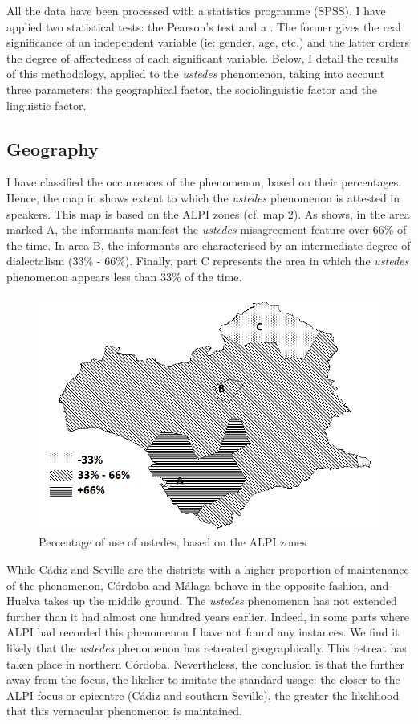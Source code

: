 \documentclass[output=paper]{LSP/langsci}
\begin{document}
All the data have been processed with a statistics programme (SPSS). I have applied two statistical tests: the Pearson’s  test and a . The former gives the real significance of an independent variable (ie: gender, age, etc.) and the latter orders the degree of affectedness of each significant variable. Below, I detail the results of this methodology, applied to the \textit{ustedes} phenomenon, taking into account three parameters: the geographical factor, the sociolinguistic factor and the linguistic factor.

\subsection{Geography}
I have classified the occurrences of the phenomenon, based on their percentages. Hence, the map in  shows extent to which the  \textit{ustedes} phenomenon is attested in speakers. This map is based on the ALPI zones (cf. map 2). As  shows, in the area marked A, the informants manifest the \textit{ustedes} misagreement feature over 66\% of the time. In area B, the informants are characterised by an intermediate degree of dialectalism (33\% - 66\%). Finally, part C represents the area in which the \textit{ustedes} phenomenon appears less than 33\% of the time.

\begin{figure}
\includegraphics[width=\textwidth]{illustrations/lara_fig3}
\caption{Percentage of use of ustedes, based on the ALPI zones}
\label{fig:3}
\end{figure}

While Cádiz and Seville are the districts with a higher proportion of maintenance of the phenomenon, Córdoba and Málaga behave in the opposite fashion, and Huelva takes up the middle ground. The \textit{ustedes} phenomenon has not extended further than it had almost one hundred years earlier. Indeed, in some parts where ALPI had recorded this phenomenon I have not found any instances. We find it likely that the \textit{ustedes} phenomenon has retreated geographically. This retreat has taken place in northern Córdoba. Nevertheless, the conclusion is that the further away from the focus, the likelier to imitate the standard usage: the closer to the ALPI focus or epicentre (Cádiz and southern Seville), the greater the likelihood that this vernacular phenomenon is maintained. 
\end{document}
